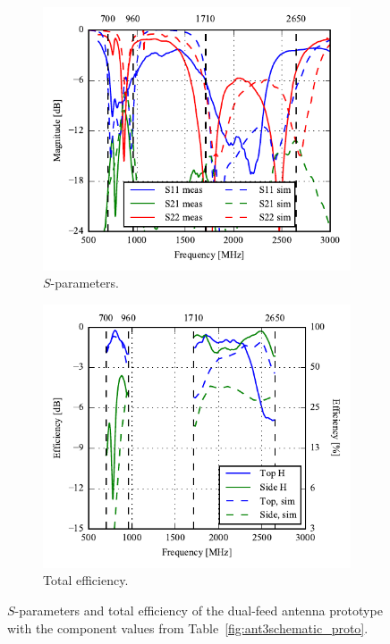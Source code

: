  \begin{figure}[htbp]
    \centering
    \begin{subfigure}{0.49\linewidth}
        \includegraphics{img/tech_sol/nonresonant/prototype/sparams.pdf}
        \caption{$S$-parameters.}
    \end{subfigure}
    \hfill
    \begin{subfigure}{0.49\linewidth}
    \includegraphics{img/tech_sol/nonresonant/prototype/eff_comp.pdf}
        \caption{Total efficiency.}
    \end{subfigure}
    \caption{$S$-parameters and total efficiency of the dual-feed antenna prototype with the component values from Table~\ref{fig:ant3schematic_proto}.}
    \label{fig:nonresonant_proto_sparam_eff}
\end{figure}

